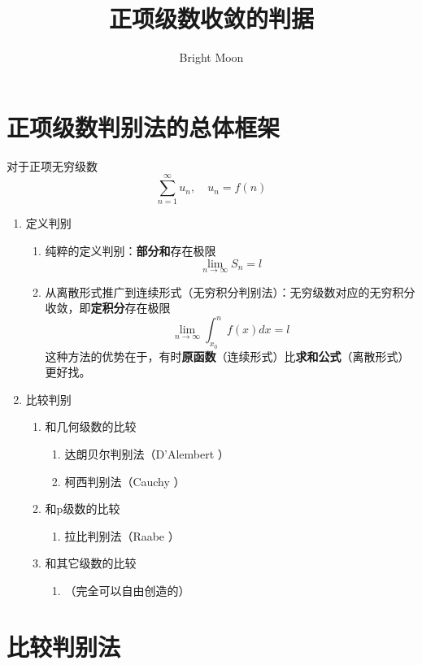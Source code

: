 \documentclass[UTF8]{ctexart}
\title{正项级数收敛的判据}
\author{Bright Moon}
\begin{document}
\maketitle


\section{正项级数判别法的总体框架}
对于正项无穷级数
\[\sum_{n=1}^{\infty} u_n,\quad u_n=f(n)\]

\begin{enumerate}
    \item 定义判别
    \begin{enumerate}
        \item 纯粹的定义判别：\textbf{部分和}存在极限
\[\lim_{n \to \infty}S_n = l\]
        \item 从离散形式推广到连续形式（无穷积分判别法）：无穷级数对应的无穷积分收敛，即\textbf{定积分}存在极限
\[\lim_{n\to \infty }\int_{x_0}^{n} f(x) dx=l\]
这种方法的优势在于，有时\textbf{原函数}（连续形式）比\textbf{求和公式}（离散形式）更好找。

    \end{enumerate}
    \item 比较判别
    \begin{enumerate}
        \item 和几何级数的比较
        \begin{enumerate}
            \item 达朗贝尔判别法（D’Alembert ）
            \item 柯西判别法（Cauchy ）
        \end{enumerate}
        \item 和p级数的比较
        \begin{enumerate}
            \item 拉比判别法（Raabe ）
        \end{enumerate}
        \item 和其它级数的比较
        \begin{enumerate}
            \item （完全可以自由创造的）

        \end{enumerate}

    \end{enumerate}

\end{enumerate}
\section{比较判别法}
\end{document}
